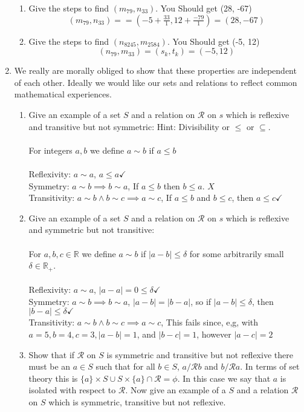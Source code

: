 \documentclass[11pt]{article}
\begin{document}
\begin{enumerate}
\begin{enumerate}
\item Give the steps to find $(m_{79}, n_{33})$.  You Should get (28, -67)
\\
$$(m_{79}, n_{33}) = = (-5 + \tfrac{33}{1}, 12 + \tfrac{-79}{1}) = (28, -67)$$
\item Give the steps to find $(n_{8245}, m_{2584})$.  You Should get (-5, 12)
\\
$$(n_{79}, m_{33}) = (s_k, t_k) = (-5, 12)$$
\end{enumerate}

\newpage %
\item We really are morally obliged to show that these properties are independent of each other. Ideally we would like our sets and relations to reflect common mathematical experiences.
\begin{enumerate}
\item Give an example of a set $S$ and a relation on $\mathcal{R}$ on $s$ which is reflexive and transitive but not symmetric: Hint: Divisibility or $\leq$ or $\subseteq$.
\\
\\
For integers $a, b$ we define $a \sim b$ if $a \leq b$\\
\\Reflexivity: $a \sim a$, $a \leq a \checkmark$
\\Symmetry: $a \sim b \implies b \sim a$, If $a \leq b$ then $b \leq a$. $X$ 
\\Transitivity: $a \sim b \wedge b \sim c \implies a \sim c$, If $a \leq b$ and $b \leq c$, then $a \leq c \checkmark$
\\
\item Give an example of a set $S$ and a relation on $\mathcal{R}$ on $s$ which is reflexive and symmetric but not transitive:\\
\\
For $a,b,c \in \mathbb{R}$ we define $a \sim b$ if $|a - b| \leq \delta$ for some arbitrarily small $\delta \in \mathbb{R}_+$.
\\
\\Reflexivity: $a \sim a$, $|a-a| = 0 \leq \delta \checkmark$
\\Symmetry: $a \sim b \implies b \sim a$, $|a-b| = |b-a|$, so if $|a-b| \leq \delta$, then $|b-a| \leq \delta  \checkmark$
\\Transitivity: $a \sim b \wedge b \sim c \implies a \sim c$, This fails since, e,g, with $a = 5, b = 4, c = 3, |a-b| = 1$, and $|b-c| = 1$, however $|a-c| = 2$
\item Show that if $\mathcal{R}$ on $S$ is symmetric and transitive but not reflexive there must be an $a \in S$ such that for all $b \in S$, $a /\mathcal{R} b$ and $b  /\mathcal{R} a$. In terms of set theory this is $\{a\} \times S \cup S \times \{a\} \cap \mathcal{R} = \phi$. In this case we say that $a$ is isolated with respect to $\mathcal{R}$. Now give an example of a $S$ and a relation $\mathcal{R}$ on $S$ which is symmetric, transitive but not reflexive.

\end{enumerate}
\end{enumerate}
\end{document}
